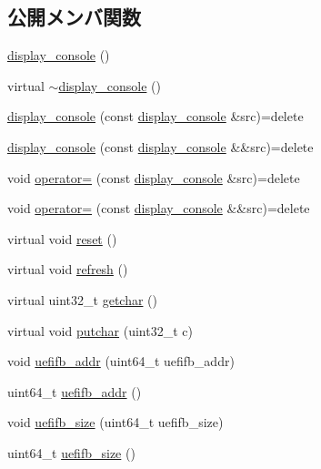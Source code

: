 \subsection*{公開メンバ関数}
\begin{DoxyCompactItemize}
\item 
\hyperlink{classdisplay__console_a6448ae90752aa1b07fd8ae741313ab7c}{display\+\_\+console} ()
\item 
virtual \hyperlink{classdisplay__console_a3e71de8ef36ebf5a251f27bfa86f90c6}{$\sim$display\+\_\+console} ()
\item 
\hyperlink{classdisplay__console_ab1499fd27e83677c4988265c2f33b011}{display\+\_\+console} (const \hyperlink{classdisplay__console}{display\+\_\+console} \&src)=delete
\item 
\hyperlink{classdisplay__console_aa8f5d62e558d0dc35877361174040e7c}{display\+\_\+console} (const \hyperlink{classdisplay__console}{display\+\_\+console} \&\&src)=delete
\item 
void \hyperlink{classdisplay__console_a516b0f989779241982595e288edab4e1}{operator=} (const \hyperlink{classdisplay__console}{display\+\_\+console} \&src)=delete
\item 
void \hyperlink{classdisplay__console_ae51c3d467acb46d3a9b715e5d362cc23}{operator=} (const \hyperlink{classdisplay__console}{display\+\_\+console} \&\&src)=delete
\item 
virtual void \hyperlink{classdisplay__console_af24f8d041c5ffb3b19ecec5521daad4a}{reset} ()
\item 
virtual void \hyperlink{classdisplay__console_a94dcd0e51a5227c807c59c99c6a739c9}{refresh} ()
\item 
virtual uint32\+\_\+t \hyperlink{classdisplay__console_aca457aab1c95f8fe79b428f9e5b43a51}{getchar} ()
\item 
virtual void \hyperlink{classdisplay__console_a06e4aae84b14832a690bb915a33f54f0}{putchar} (uint32\+\_\+t c)
\item 
void \hyperlink{classdisplay__console_a0f34879169e6cc12e03071575c87dd83}{uefifb\+\_\+addr} (uint64\+\_\+t uefifb\+\_\+addr)
\item 
uint64\+\_\+t \hyperlink{classdisplay__console_a857a888bad7b9174a3b1310762718433}{uefifb\+\_\+addr} ()
\item 
void \hyperlink{classdisplay__console_afb29b425b4809708e4d1c89a2717847b}{uefifb\+\_\+size} (uint64\+\_\+t uefifb\+\_\+size)
\item 
uint64\+\_\+t \hyperlink{classdisplay__console_a1163663484e3dc414a3f0891137fc590}{uefifb\+\_\+size} ()

\end{DoxyCompactItemize}
